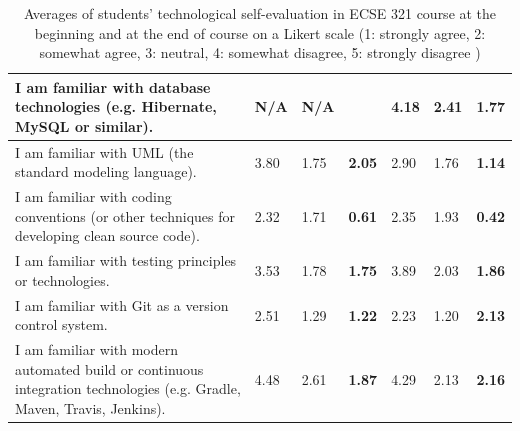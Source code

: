 \documentclass[a4paper,11pt]{article}
\begin{document}
\begin{table}[htb]
\begin{tabular}{@{}p{8cm}p{1cm}p{1cm}p{1cm}p{1cm}p{1cm}p{1cm}@{}}
I am familiar with database technologies (e.g. Hibernate, MySQL or similar). & N/A & N/A & & 
4.18 & 2.41 & \textbf{1.77}  \\ \midrule

I am familiar with UML (the standard modeling language). & 3.80 & 1.75 & \textbf{2.05} & 
2.90 & 1.76 & \textbf{1.14}  \\ \midrule

I am familiar with coding conventions (or other techniques for developing clean source code). & 2.32 & 1.71 & \textbf{0.61} & 2.35 & 1.93 & \textbf{0.42}   \\ \midrule

I am familiar with testing principles or technologies.
& 3.53 & 1.78 & \textbf{1.75} & 3.89 & 2.03 & \textbf{1.86}  \\ \midrule

I am familiar with Git as a version control system.
& 2.51 & 1.29 & \textbf{1.22} & 2.23 & 1.20 & \textbf{2.13}  \\ \midrule

I am familiar with modern automated build or continuous integration technologies (e.g. Gradle, Maven, Travis, Jenkins).
& 4.48 & 2.61 & \textbf{1.87} & 4.29 & 2.13 & \textbf{2.16}  \\ \midrule

\bottomrule
\end{tabular}
\caption{Averages of students' technological self-evaluation in ECSE 321 course at the beginning and at the end of course on a Likert scale (1: strongly agree, 2: somewhat agree, 3: neutral, 4: somewhat disagree, 5: strongly disagree ) }
\label{tab:tech-eval-ecse321}
\end{table}
\end{document}
